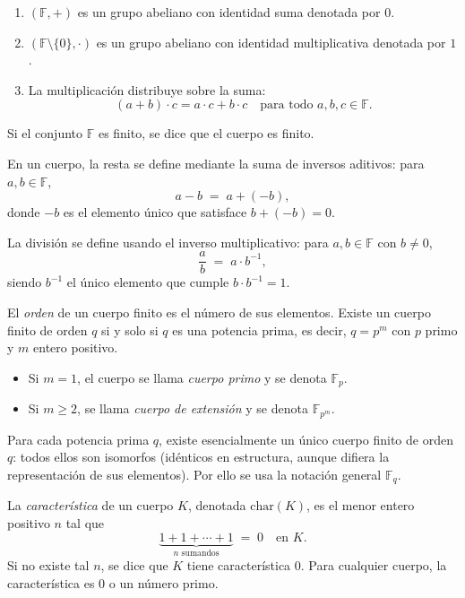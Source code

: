 \begin{enumerate}
  \item $(\mathbb{F},+)$ es un grupo abeliano con identidad suma denotada por $0$.
  \item $(\mathbb{F}\setminus\{0\},\cdot)$ es un grupo abeliano con identidad multiplicativa denotada por $1$.
  \item La multiplicación distribuye sobre la suma:
    \[
      (a + b)\cdot c = a\cdot c + b\cdot c
      \quad\text{para todo }a,b,c\in\mathbb{F}.
    \]
\end{enumerate}

Si el conjunto \(\mathbb{F}\) es finito, se dice que el cuerpo es finito.  

En un cuerpo, la resta se define mediante la suma de inversos aditivos: para \(a,b\in\mathbb{F}\),  
\[
  a - b \;=\; a + (-b),
\]
donde \(-b\) es el elemento único que satisface \(b + (-b) = 0\).  

La división se define usando el inverso multiplicativo: para \(a,b\in\mathbb{F}\) con \(b\neq0\),
\[
  \frac{a}{b} \;=\; a \cdot b^{-1},
\]
siendo \(b^{-1}\) el único elemento que cumple \(b\cdot b^{-1}=1\).  

El \emph{orden} de un cuerpo finito es el número de sus elementos. Existe un cuerpo finito de orden \(q\) si y solo si \(q\) es una potencia prima, es decir, \(q = p^m\) con \(p\) primo y \(m\) entero positivo.

\begin{itemize}
  \item Si \(m=1\), el cuerpo se llama \emph{cuerpo primo} y se denota \(\mathbb{F}_p\).
  \item Si \(m\ge2\), se llama \emph{cuerpo de extensión} y se denota \(\mathbb{F}_{p^m}\).
\end{itemize}

Para cada potencia prima \(q\), existe esencialmente un único cuerpo finito de orden \(q\): todos ellos son isomorfos (idénticos en estructura, aunque difiera la representación de sus elementos). Por ello se usa la notación general \(\mathbb{F}_q\).

\begin{definicion}\label{def:caracteristica}
La \emph{característica} de un cuerpo \(K\), denotada \(\mathrm{char}(K)\), es el menor entero positivo \(n\) tal que
\[
  \underbrace{1 + 1 + \cdots + 1}_{n\text{ sumandos}} \;=\; 0\quad\text{en }K.
\]
Si no existe tal \(n\), se dice que \(K\) tiene característica \(0\). Para cualquier cuerpo, la característica es \(0\) o un número primo.
\end{definicion}

